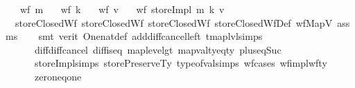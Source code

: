 \begin{isabellebody}
\ \ \ {\isachardoublequoteopen}wf\ m{\isachardoublequoteclose}\isanewline
\ \ \ {\isachardoublequoteopen}wf\ k{\isachardoublequoteclose}\isanewline
\ \ \ {\isachardoublequoteopen}wf\ v{\isachardoublequoteclose}\isanewline
\ \ \ {\isachardoublequoteopen}wf\ {\isacharparenleft}{\kern0pt}storeImpl\ m\ k\ v{\isacharparenright}{\kern0pt}{\isachardoublequoteclose}\isanewline
%
\isadelimproof
\ \ %
\endisadelimproof
%
\isatagproof
{}\isamarkupfalse%
\ \ storeClosedWf{}\ storeClosedWf{}\ storeClosedWf{}\ storeClosedWfDef\ wfMapV\ assms\isanewline
\ \ \isamarkupfalse%
\ {\isacharparenleft}{\kern0pt}smt\ {\isacharparenleft}{\kern0pt}verit{\isacharparenright}{\kern0pt}\ One{\isacharunderscore}{\kern0pt}nat{\isacharunderscore}{\kern0pt}def\ add{\isacharunderscore}{\kern0pt}diff{\isacharunderscore}{\kern0pt}cancel{\isacharunderscore}{\kern0pt}left{\isacharprime}{\kern0pt}\ tmap{\isacharunderscore}{\kern0pt}lvl{\isachardot}{\kern0pt}simps{\isacharparenleft}{\kern0pt}{}{\isacharcomma}{\kern0pt}{}{\isacharparenright}{\kern0pt}\isanewline
\ \ \ \ \ \ diff{\isacharunderscore}{\kern0pt}diff{\isacharunderscore}{\kern0pt}cancel\ diff{\isacharunderscore}{\kern0pt}is{\isacharunderscore}{\kern0pt}{}{\isacharunderscore}{\kern0pt}eq\ map{\isacharunderscore}{\kern0pt}level{\isacharunderscore}{\kern0pt}gt{\isacharunderscore}{\kern0pt}{}\ mapval{\isacharunderscore}{\kern0pt}ty{\isacharunderscore}{\kern0pt}eq{\isacharunderscore}{\kern0pt}ty{}{}{}\ plus{\isacharunderscore}{\kern0pt}{}{\isacharunderscore}{\kern0pt}eq{\isacharunderscore}{\kern0pt}Suc\isanewline
\ \ \ \ \ \ storeImpl{\isachardot}{\kern0pt}simps\ storePreserveTy\ type{\isacharunderscore}{\kern0pt}of{\isacharunderscore}{\kern0pt}val{\isachardot}{\kern0pt}simps{\isacharparenleft}{\kern0pt}{}{\isacharcomma}{\kern0pt}{}{\isacharparenright}{\kern0pt}\ wf{\isachardot}{\kern0pt}cases\ wf{\isacharunderscore}{\kern0pt}impl{\isacharunderscore}{\kern0pt}wf{\isacharunderscore}{\kern0pt}ty\isanewline
\ \ \ \ \ \ zero{\isacharunderscore}{\kern0pt}neq{\isacharunderscore}{\kern0pt}one{\isacharparenright}{\kern0pt}%
\endisatagproof
{\isafoldproof}%
%
\isadelimproof
%
\endisadelimproof
%
\isadelimdocument
%
\endisadelimdocument
%
\isatagdocument
%
\isamarkuptrue%
%
\endisatagdocument
{\isafolddocument}%
%
\isadelimdocument

\end{isabellebody}
